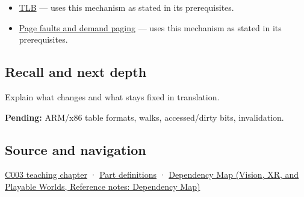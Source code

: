 \hypertarget{appendix-01e5905165c4-used-by}{}

\begin{itemize}
\tightlist
\item
  \hyperref[appendix-7a2d9c5ce511]{TLB} --- uses this mechanism as stated in its prerequisites.
\item
  \hyperref[appendix-cc0909a7ef14]{Page faults and demand paging} --- uses this mechanism as stated in its prerequisites.
\end{itemize}

\subsection{Recall and next depth}\label{appendix-01e5905165c4-recall-and-next-depth}

\hypertarget{appendix-01e5905165c4-recall-and-next-depth}{}

Explain what changes and what stays fixed in translation.

\textbf{Pending:} ARM/x86 table formats, walks, accessed/dirty bits, invalidation.

\subsection{Source and navigation}\label{appendix-01e5905165c4-source-and-navigation}

\hypertarget{appendix-01e5905165c4-source-and-navigation}{}

\hyperref[01-foundations-i-ch002-where-the-bytes-live]{C003 teaching chapter} · \hyperref[appendix-fd090d982a15-m003---parts-41-60]{Part definitions} · \href{../07-Vision-XR-and-Playable-Worlds/main.pdf\#nameddest=appendix-4ad47bdd269a}{Dependency Map (Vision, XR, and Playable Worlds, Reference notes: Dependency Map)}
